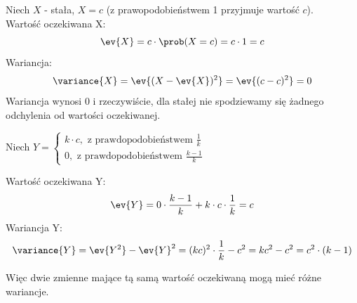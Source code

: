 \begin{example}
	Niech \(X\) - stała, \(X = c\) (z prawopodobieństwem 1 przyjmuje wartość \(c\)). \\
    Wartość oczekiwana X:
    \[
        \ev{X} = c \cdot \prob(X = c) = c \cdot 1 = c
    \]
    Wariancja:
    \[
        \variance{X} = \ev{(X - \ev{X})^2} = \ev{(c - c)^2} = 0
    \]
    Wariancja wynosi 0 i rzeczywiście, dla stałej nie spodziewamy się żadnego odchylenia od wartości oczekiwanej.


    Niech \(Y = \begin{cases}
        k \cdot c, \text{ z prawdopodobieństwem } \frac{1}{k} \\
        0, \text{ z prawdopodobieństwem } \frac{k - 1}{k}
    \end{cases}\)

    Wartość oczekiwana Y:
    \[
        \ev{Y} = 0 \cdot \frac{k-1}{k} + k \cdot c \cdot \frac{1}{k} = c
    \]
    Wariancja Y:
    \[
        \variance{Y} = \ev{Y^2} - \ev{Y}^2 = (kc)^2 \cdot \frac{1}{k} - c^2 = kc^2 - c^2 = c^2 \cdot (k - 1)
    \]

    Więc dwie zmienne mające tą samą wartość oczekiwaną mogą mieć różne wariancje.
\end{example}